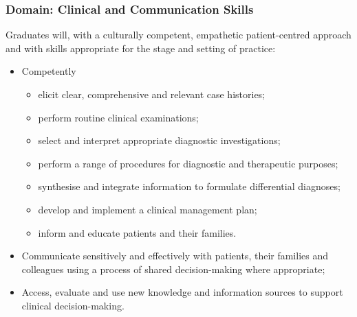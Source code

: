 \documentclass[11pt,fleqn]{book} %
\begin{document}
\subsubsection{Domain: Clinical and Communication Skills}
Graduates will, with a culturally competent, empathetic patient-centred approach and with skills appropriate for the stage and setting of practice:
\begin{itemize}
\item	Competently 
  \begin{itemize}
  \item	elicit clear, comprehensive and relevant case histories; 
  \item perform routine clinical examinations;
  \item select and interpret appropriate diagnostic investigations; 
  \item perform a range of procedures for diagnostic and therapeutic purposes;
  \item synthesise and integrate information to formulate differential diagnoses;
  \item develop and implement a clinical management plan;
  \item inform and educate patients and their families.
  \end{itemize}
\item Communicate sensitively and effectively with patients, their families and colleagues using a process of shared decision-making where appropriate;
\item Access, evaluate and use new knowledge and information sources to support clinical decision-making. 
\end{itemize}
\end{document}
